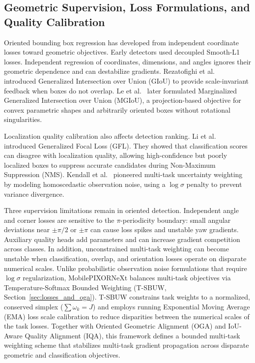 \subsection{Geometric Supervision, Loss Formulations, and Quality Calibration}
\label{sec:rel_supervision_losses}

Oriented bounding box regression has developed from independent coordinate losses toward geometric objectives. Early detectors used decoupled Smooth-L1 losses. Independent regression of coordinates, dimensions, and angles ignores their geometric dependence and can destabilize gradients. Rezatofighi et al.~\cite{rezatofighi2019giou} introduced Generalized Intersection over Union (GIoU) to provide scale-invariant feedback when boxes do not overlap. Le et al.~\cite{le2026mgiou} later formulated Marginalized Generalized Intersection over Union (MGIoU), a projection-based objective for convex parametric shapes and arbitrarily oriented boxes without rotational singularities.

Localization quality calibration also affects detection ranking. Li et al.~\cite{li2020gfl} introduced Generalized Focal Loss (GFL). They showed that classification scores can disagree with localization quality, allowing high-confidence but poorly localized boxes to suppress accurate candidates during Non-Maximum Suppression (NMS). Kendall et al.~\cite{kendall2018uncertainty} pioneered multi-task uncertainty weighting by modeling homoscedastic observation noise, using a $\log \sigma$ penalty to prevent variance divergence.

Three supervision limitations remain in oriented detection. Independent angle and corner losses are sensitive to the $\pi$-periodicity boundary: small angular deviations near $\pm \pi/2$ or $\pm \pi$ can cause loss spikes and unstable yaw gradients. Auxiliary quality heads add parameters and can increase gradient competition across classes. In addition, unconstrained multi-task weighting can become unstable when classification, overlap, and orientation losses operate on disparate numerical scales. Unlike probabilistic observation noise formulations that require $\log \sigma$ regularization, MobilePIXORNeXt balances multi-task objectives via Temperature-Softmax Bounded Weighting (T-SBUW, Section~\ref{sec:losses_and_oga}). T-SBUW constrains task weights to a normalized, conserved simplex ($\sum \omega_k = J$) and employs running Exponential Moving Average (EMA) loss scale calibration to reduce disparities between the numerical scales of the task losses. Together with Oriented Geometric Alignment (OGA) and IoU-Aware Quality Alignment (IQA), this framework defines a bounded multi-task weighting scheme that stabilizes multi-task gradient propagation across disparate geometric and classification objectives.

